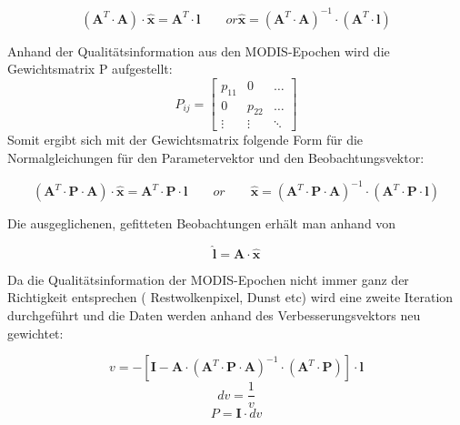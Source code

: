 \documentclass[11pt]{report}
\begin{document}
\begin{equation}
\left(\textbf{A}^T\cdot\textbf{A}\right)\cdot\widehat{\textbf{x}}=\textbf{A}^T\cdot\textbf{l}\qquad or  \widehat{\textbf{x}}=\left(\textbf{A}^T\cdot\textbf{A}\right)^{-1}\cdot\left(\textbf{A}^T\cdot\textbf{l}\right)
\end{equation}\newline


Anhand der Qualitätsinformation aus den MODIS-Epochen wird die Gewichtsmatrix P aufgestellt:
\begin{equation}
\label{p_mat}
P_{ij} = \left[ \begin{array}{cccc} p_{11} & 0 & \ldots \\0 & p_{22} & \ldots \\ \vdots & \vdots & \ddots \end{array} \right]
\end{equation}\newline
Somit ergibt sich mit der Gewichtsmatrix folgende Form für die Normalgleichungen für den Parametervektor und den Beobachtungsvektor:

\begin{equation}
\left(\textbf{A}^T\cdot\textbf{P}\cdot\textbf{A}\right)\cdot\widehat{\textbf{x}}=\textbf{A}^T\cdot\textbf{P}\cdot\textbf{l}\qquad or \qquad \widehat{\textbf{x}}=\left(\textbf{A}^T\cdot\textbf{P}\cdot\textbf{A}\right)^{-1}\cdot\left(\textbf{A}^T\cdot\textbf{P}\cdot\textbf{l}\right)
\end{equation}\newline

Die ausgeglichenen, gefitteten Beobachtungen erhält man anhand von

\begin{equation}
\widehat{\textbf{l}} = \textbf{A}\cdot\widehat{\textbf{x}}
\end{equation}\newline

Da die Qualitätsinformation der MODIS-Epochen nicht immer ganz der Richtigkeit entsprechen ( Restwolkenpixel, Dunst etc) wird eine zweite Iteration durchgeführt und die Daten werden anhand des Verbesserungsvektors neu gewichtet:

\begin{equation}
v=-\left[ \textbf{I}-\textbf{A}\cdot\left(\textbf{A}^T\cdot\textbf{P}\cdot\textbf{A}\right)^{-1}\cdot\left(\textbf{A}^T\cdot\textbf{P}\right)   \right]\cdot\textbf{l}
\end{equation}\newline
\begin{equation}
dv=\frac{1}{v}
\end{equation}
\begin{equation}
P=\textbf{I}\cdot dv
\end{equation}\newline
\end{document}
